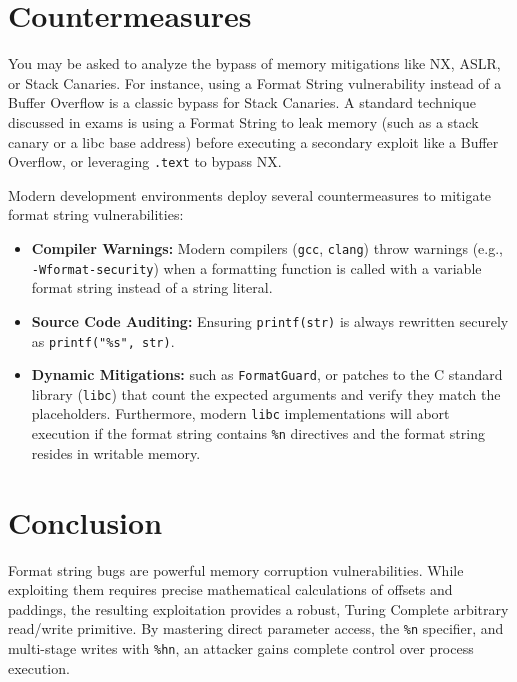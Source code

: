 \section{Countermeasures}

\begin{tcolorbox}[colback=blue!5!white,colframe=blue!75!black,title=Exam Insight]
You may be asked to analyze the bypass of memory mitigations like NX, ASLR, or Stack Canaries. For instance, using a Format String vulnerability instead of a Buffer Overflow is a classic bypass for Stack Canaries. A standard technique discussed in exams is using a Format String to leak memory (such as a stack canary or a libc base address) before executing a secondary exploit like a Buffer Overflow, or leveraging \texttt{.text} to bypass NX.
\end{tcolorbox}

Modern development environments deploy several countermeasures to mitigate format string vulnerabilities:
\begin{itemize}
    \item \textbf{Compiler Warnings:} Modern compilers (\texttt{gcc}, \texttt{clang}) throw warnings (e.g., \texttt{-Wformat-security}) when a formatting function is called with a variable format string instead of a string literal.
    \item \textbf{Source Code Auditing:} Ensuring \texttt{printf(str)} is always rewritten securely as \texttt{printf("\%s", str)}.
    \item \textbf{Dynamic Mitigations:} such as \texttt{FormatGuard}, or patches to the C standard library (\texttt{libc}) that count the expected arguments and verify they match the placeholders. Furthermore, modern \texttt{libc} implementations will abort execution if the format string contains \texttt{\%n} directives and the format string resides in writable memory.
\end{itemize}

\section{Conclusion}
Format string bugs are powerful memory corruption vulnerabilities. While exploiting them requires precise mathematical calculations of offsets and paddings, the resulting exploitation provides a robust, Turing Complete arbitrary read/write primitive. By mastering direct parameter access, the \texttt{\%n} specifier, and multi-stage writes with \texttt{\%hn}, an attacker gains complete control over process execution.

